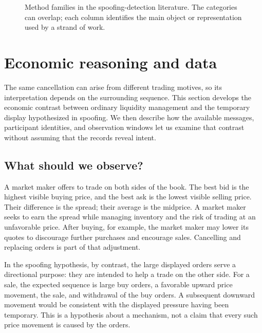 \documentclass[11pt]{article}
\begin{document}
\begin{figure}[htbp]
    \caption{Method families in the spoofing-detection literature. The categories can overlap; each column identifies
    the main object or representation used by a strand of work.}
    \label{fig:method_taxonomy}
\end{figure}
\FloatBarrier

\section{Economic reasoning and data}
\label{sec:data}

The same cancellation can arise from different trading motives, so its interpretation depends on the surrounding sequence. This section develops the economic contrast between ordinary liquidity management and the temporary display hypothesized in spoofing. We then describe how the available messages, participant identities, and observation windows let us examine that contrast without assuming that the records reveal intent.

\subsection{What should we observe?}
\label{sec:mm_vs_spoofing}
\label{subsec:market_maker}
\label{subsec:spoofing}
A market maker offers to trade on both sides of the book. The best bid is the highest visible buying price, and the best ask is the lowest visible selling price. Their difference is the spread; their average is the midprice. A market maker seeks to earn the spread while managing inventory and the risk of trading at an unfavorable price. After buying, for example, the market maker may lower its quotes to discourage further purchases and encourage sales. Cancelling and replacing orders is part of that adjustment.

In the spoofing hypothesis, by contrast, the large displayed orders serve a directional purpose: they are intended to help a trade on the other side. For a sale, the expected sequence is large buy orders, a favorable upward price movement, the sale, and withdrawal of the buy orders. A subsequent downward movement would be consistent with the displayed pressure having been temporary. This is a hypothesis about a mechanism, not a claim that every such price movement is caused by the orders.
\end{document}
